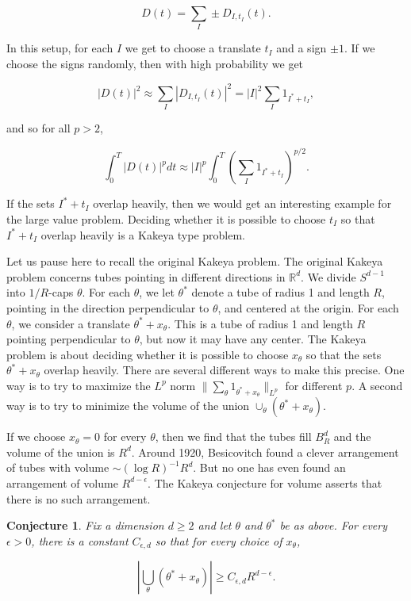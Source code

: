 \documentclass{amsart}
\newtheorem{conj}[prop]{Conjecture}
\newcommand{\RR}{\mathbb{R}}
\begin{document}
$$ D(t) = \sum_I \pm D_{I, t_I}(t). $$

\noindent In this setup,  for each $I$ we get to choose a translate $t_I$ and a sign $\pm 1$.   If we choose the signs randomly,  then with high probability we get

$$ |D(t)|^2 \approx \sum_I | D_{I, t_I}(t) |^2 = |I|^2 \sum_I 1_{I^* + t_I}, $$

and so for all $p > 2$, 

$$ \int_0^T |D(t)|^p dt \approx |I|^p \int_0^T \left( \sum_I  1_{I^* + t_I} \right)^{p/2}. $$

If the sets $I^* + t_I$ overlap heavily,  then we would get an interesting example for the large value problem.   Deciding whether it is possible to choose $t_I$ so that $I^* + t_I$ overlap heavily is a Kakeya type problem.

Let us pause here to recall the original Kakeya problem.
The original Kakeya problem concerns tubes pointing in different directions in $\RR^d$.   We divide $S^{d-1}$ into $1/R$-caps $\theta$.   For each $\theta$, we let $\theta^*$ denote a tube of radius 1 and length $R$,  pointing in the direction perpendicular to $\theta$, and centered at the origin.   For each $\theta$,  we consider a translate $\theta^* + x_\theta$.   This is a tube of radius 1 and length $R$ pointing perpendicular to $\theta$,  but now it may have any center.   The Kakeya problem is about deciding whether it is possible to choose $x_\theta$ so that the sets $\theta^* + x_\theta$ overlap heavily.   There are several different ways to make this precise.   One way is to try to maximize the $L^p$ norm $ \| \sum_\theta 1_{\theta^* + x_\theta} \|_{L^p}$ for different $p$.   A second way is to try to minimize the volume of the union $\cup_\theta (\theta^* + x_\theta)$.   

If we choose $x_\theta = 0$ for every $\theta$,  then we find that the tubes fill $B_R^d$ and the volume of the union is $R^d$.   Around 1920,  Besicovitch found a clever arrangement of tubes with volume $\sim (\log R)^{-1} R^d$.   But no one has even found an arrangement of volume $R^{d - \epsilon}$.   The Kakeya conjecture for volume asserts that there is no such arrangement.

\begin{conj} \label{kakvol} Fix a dimension $d \ge 2$ and let $\theta$ and $\theta^*$ be as above.  For every $\epsilon > 0$,  there is a constant $C_{\epsilon, d}$ so that for every choice of $x_\theta$,  

$$ \left| \bigcup_\theta (\theta^* + x_\theta) \right| \ge C_{\epsilon,d} R^{d - \epsilon}. $$

\end{conj}
\end{document}
